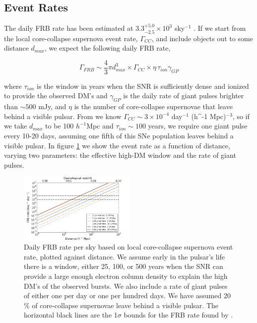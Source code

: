 \documentclass[useAMS,usenatbib]{emulateapj}
\begin{document}
\subsection{Event Rates}

The daily FRB rate has been estimated at $3.3^{+5.0}_{-2.5}\times10^3$ sky$^{-1}$ 
\citep{2015arXiv150500834R}. If we start from the local core-collapse supernova
event rate, $\Gamma_{CC}$, and include objects out to some distance $d_{max}$,
we expect the following daily FRB rate, 

\begin{equation}
\Gamma_{FRB} \sim  \frac{4}{3} \pi d_{max}^3 \times \Gamma_{CC} \times
 \eta \, \tau_{ion} \gamma_{GP}
\end{equation}

\noindent where $\tau_{ion}$ is the window in years when the SNR is sufficiently
dense and ionized to provide the observed DM's and $\gamma_{GP}$
is the daily rate of giant pulses brighter than $\sim 500$ mJy, and $\eta$
is the number of core-collapse supernovae that leave behind a visible pulsar. 
From \cite{2014ApJ...792..135T} we know  
$\Gamma_{CC}\sim3 \times 10^{-4}$ day$^{-1}$ (h^{-1} Mpc)$^{-3}$,
so if we take $d_{max}$ to be 100 $h^{-1}$Mpc and $\tau_{ion}\sim100$ years,
we require one giant pulse every 10-20 days, assuming one fifth of this SNe population
leaves behind a visible pulsar.
In figure \ref{FIG-RATE} 
we show the event rate as a function of distance, varying two parameters: the 
effective high-DM window and the rate of giant pulses. 

\begin{figure}[h!]
  \centering
   \includegraphics[width=0.5\textwidth]{FRB_SNR_rate.png}
   \caption{Daily FRB rate per sky based on local core-collapse supernova 
   event rate, plotted against distance.
   We assume early in the pulsar's life there is a window, either 
   25, 100, or 500 years when the SNR can provide a large enough electron 
   column density to explain the high DM's of the observed bursts. We also
   include a rate of giant pulses of either one per day or one per hundred
   days. We have assumed 20$\%$ of core-collapse supernovae leave behind
   a visible pulsar.
   The horizontal black lines are the 1$\sigma$ bounds for the FRB rate
   found by \cite{2015arXiv150500834R}.}
   \label{FIG-RATE}
\end{figure}
\end{document}

